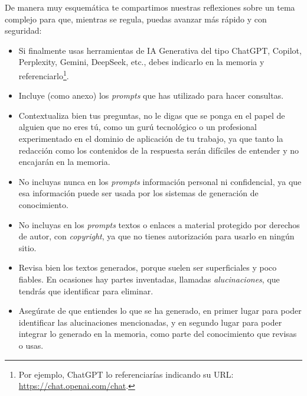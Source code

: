 De manera muy esquemática te compartimos nuestras reflexiones sobre un tema complejo para que, mientras se regula, puedas avanzar más rápido y con seguridad:

\begin{itemize}  %
    \item Si finalmente usas herramientas de IA Generativa del tipo ChatGPT, Copilot, Perplexity, Gemini, DeepSeek, etc., debes indicarlo en la memoria y referenciarlo\footnote{Por ejemplo, ChatGPT lo referenciarías indicando su URL: 
    \url{https://chat.openai.com/chat}.}.
    \item Incluye (como anexo) los \textit{prompts} que has utilizado para hacer consultas.
    \item Contextualiza bien tus preguntas, no le digas que se ponga en el papel de alguien que no eres tú, como un gurú tecnológico o un profesional experimentado en el dominio de aplicación de tu trabajo, ya que tanto la redacción como los contenidos de la respuesta serán difíciles de entender y no encajarán en la memoria.
    \item No incluyas nunca en los \textit{prompts} información personal ni confidencial, ya que esa información puede ser usada por los sistemas de generación de conocimiento.
    \item No incluyas en los \textit{prompts} textos o enlaces a material protegido por derechos de autor, con \textit{copyright}, ya que no tienes autorización para usarlo en ningún sitio.
    \item Revisa bien los textos generados, porque suelen ser superficiales y poco fiables. En ocasiones hay partes inventadas, llamadas \textit{alucinaciones}, que tendrás que identificar para eliminar.
    \item Asegúrate de que entiendes lo que se ha generado, en primer lugar para poder identificar las alucinaciones mencionadas, y en segundo lugar para poder integrar lo generado en la memoria, como parte del conocimiento que revisas o usas.
\end{itemize}



